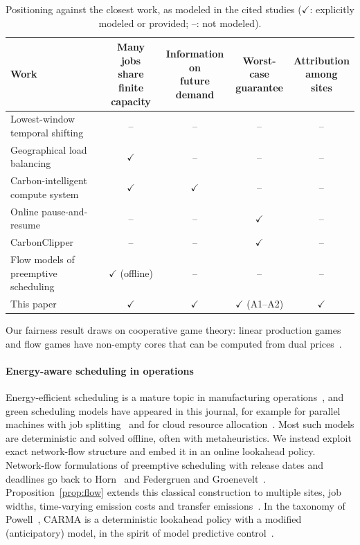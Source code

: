 \begin{table}[!htbp]
\centering
\caption{Positioning against the closest work, as modeled in the cited studies ($\checkmark$: explicitly modeled or provided; --: not modeled).}
\label{tab:related}
\footnotesize
\footnotesize\setlength{\tabcolsep}{3pt}
\begin{tabular}{p{4.3cm}cccc}
\toprule
Work & \makecell{Many jobs share\\finite capacity} & \makecell{Information on\\future demand} & \makecell{Worst-case\\guarantee} & \makecell{Attribution\\among sites} \\
\midrule
Lowest-window temporal shifting~\cite{wiesner2021lets} & -- & -- & -- & -- \\
Geographical load balancing~\cite{liu2011greening} & $\checkmark$ & -- & -- & -- \\
Carbon-intelligent compute system~\cite{radovanovic2023carbon} & $\checkmark$ & $\checkmark$ & -- & -- \\
Online pause-and-resume~\cite{lechowicz2023online} & -- & -- & $\checkmark$ & -- \\
CarbonClipper~\cite{lechowicz2025learning} & -- & -- & $\checkmark$ & -- \\
Flow models of preemptive scheduling~\cite{horn1974some,federgruen1986preemptive} & $\checkmark$ (offline) & -- & -- & -- \\
This paper & $\checkmark$ & $\checkmark$ & $\checkmark$ (A1--A2) & $\checkmark$ \\
\bottomrule
\end{tabular}
\end{table} Our fairness result draws on cooperative game theory: linear production games and flow games have non-empty cores that can be computed from dual prices~\cite{owen1975core,kalai1982totally}.

\paragraph{Energy-aware scheduling in operations} Energy-efficient scheduling is a mature topic in manufacturing operations~\cite{gahm2016energy}, and green scheduling models have appeared in this journal, for example for parallel machines with job splitting~\cite{asadpour2022green} and for cloud resource allocation~\cite{sharma2024efficient}. Most such models are deterministic and solved offline, often with metaheuristics. We instead exploit exact network-flow structure and embed it in an online lookahead policy. Network-flow formulations of preemptive scheduling with release dates and deadlines go back to Horn~\cite{horn1974some} and Federgruen and Groenevelt~\cite{federgruen1986preemptive}. Proposition~\ref{prop:flow} extends this classical construction to multiple sites, job widths, time-varying emission costs and transfer emissions~\cite{ahuja1993network,orlin1997polynomial}. In the taxonomy of Powell~\cite{powell2019unified}, CARMA is a deterministic lookahead policy with a modified (anticipatory) model, in the spirit of model predictive control~\cite{rawlings2017model,mayne2000constrained}.

